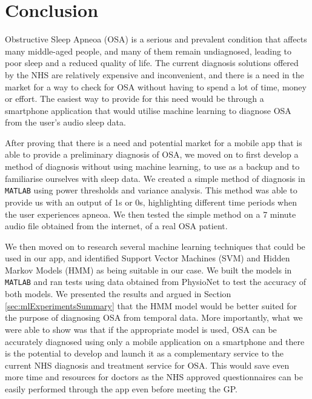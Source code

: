 \chapter{Conclusion}
\label{ch:conclusion}
 
Obstructive Sleep Apneoa (OSA) is a serious and prevalent condition that affects many middle-aged people, and many of them remain undiagnosed, leading to poor sleep and a reduced quality of life. The current diagnosis solutions offered by the NHS are relatively expensive and inconvenient, and there is a need in the market for a way to check for OSA without having to spend a lot of time, money or effort. The easiest way to provide for this need would be through a smartphone application that would utilise machine learning to diagnose OSA from the user's audio sleep data.

After proving that there is a need and potential market for a mobile app that is able to provide a preliminary diagnosis of OSA, we moved on to first develop a method of diagnosis without using machine learning, to use as a backup and to familiarise ourselves with sleep data. We created a simple method of diagnosis in \verb!MATLAB!\textsuperscript{\textregistered} using power thresholds and variance analysis. This method was able to provide us with an output of 1s or 0s, highlighting different time periods when the user experiences apneoa. We then tested the simple method on a 7 minute audio file obtained from the internet, of a real OSA patient.

We then moved on to research several machine learning techniques that could be used in our app, and identified Support Vector Machines (SVM) and Hidden Markov Models (HMM) as being suitable in our case. We built the models in \verb!MATLAB!\textsuperscript{\textregistered} and ran tests using data obtained from PhysioNet to test the accuracy of both models. We presented the results and argued in Section \ref{sec:mlExperimentsSummary} that the HMM model would be better suited for the purpose of diagnosing OSA from temporal data. 
More importantly, what we were able to show was that if the appropriate model is used, OSA can be accurately diagnosed using only a mobile application on a smartphone and there is the potential to develop and launch it as a complementary service to the current NHS diagnosis and treatment service for OSA. This would save even more time and resources for doctors as the NHS approved questionnaires can be easily performed through the app even before meeting the GP.

